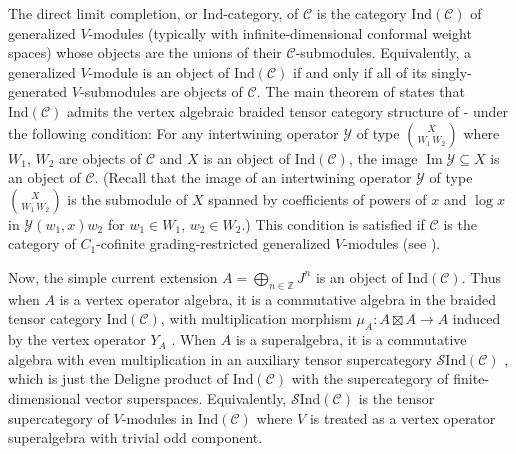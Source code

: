 \documentclass[11pt, reqno]{amsart}
\theoremstyle{definition}\newtheorem{defi}[thm]{Definition}
\theoremstyle{definition}\newtheorem{rem}[thm]{Remark}
\theoremstyle{definition}\newtheorem{exam}[thm]{Example}
\theoremstyle{definition}\newtheorem{assum}[thm]{Assumption}
\newcommand{\cY}{\mathcal{Y}}
\newcommand{\cS}{\mathcal{S}}
\newcommand{\cC}{\mathcal{C}}
\newcommand{\ZZ}{\mathbb{Z}}
\newcommand{\tens}{\boxtimes}
\newcommand{\ind}{\mathrm{Ind}}
\DeclareMathOperator{\im}{Im}
\begin{document}
 The direct limit completion, or $\mathrm{Ind}$-category, of $\cC$ is the category $\ind(\cC)$ of generalized $V$-modules (typically with infinite-dimensional conformal weight spaces) whose objects are the unions of their $\cC$-submodules. Equivalently, a generalized $V$-module is an object of $\ind(\cC)$ if and only if all of its singly-generated $V$-submodules are objects of $\cC$. The main theorem of \cite{CMY-completions} states that $\ind(\cC)$ admits the vertex algebraic braided tensor category structure of \cite{HLZ1}-\cite{HLZ8} under the following condition: For any intertwining operator $\cY$ of type $\binom{X}{W_1\,W_2}$ where $W_1$, $W_2$ are objects of $\cC$ and $X$ is an object of $\ind(\cC)$, the image $\im\cY\subseteq X$ is an object of $\cC$. (Recall that the image of an intertwining operator $\cY$ of type $\binom{X}{W_1\,W_2}$ is the submodule of $X$ spanned by coefficients of powers of $x$ and $\log x$ in $\cY(w_1,x)w_2$ for $w_1\in W_1$, $w_2\in W_2$.) This condition is satisfied if $\cC$ is the category of $C_1$-cofinite grading-restricted generalized $V$-modules (see \cite[Theorem 7.1]{CMY-completions}).
 
Now, the simple current extension $A=\bigoplus_{n\in\ZZ} J^n$ is an object of $\ind(\cC)$. Thus when $A$ is a vertex operator algebra, it is a commutative algebra in the braided tensor category $\ind(\cC)$, with multiplication morphism $\mu_A: A\tens A\rightarrow A$ induced by the vertex operator $Y_A$ \cite{HKL, CMY-completions}. When $A$ is a superalgebra, it is a commutative algebra with even multiplication in an auxiliary tensor supercategory $\cS\ind(\cC)$ \cite{CKL, CKM-exts}, which is just the Deligne product of $\ind(\cC)$ with the supercategory of finite-dimensional vector superspaces. Equivalently, $\cS\ind(\cC)$ is the tensor supercategory of $V$-modules in $\ind(\cC)$ where $V$ is treated as a vertex operator superalgebra with trivial odd component.
\end{document}
